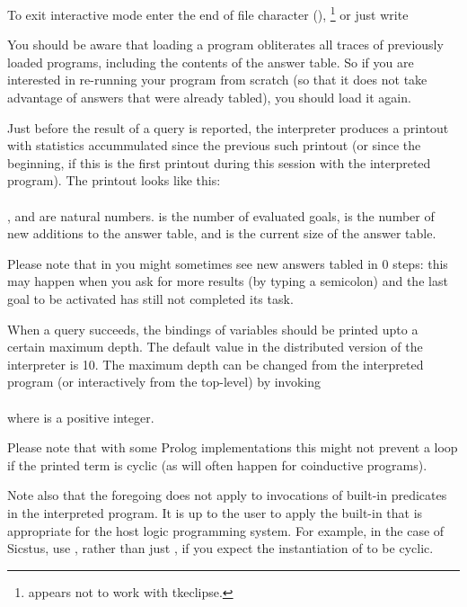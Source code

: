 To exit interactive mode enter the end of file character
(),%
\footnote{
   appears not to work with tkeclipse.}
or just write\\
\ind{}

You should be aware that loading a program obliterates all traces of
previously loaded programs, including the contents of the answer table.  So
if you are interested in re-running your program from scratch (so that it
does not take advantage of answers that were already tabled), you should load
it again.

Just before the result of a query is reported, the interpreter produces a
printout with statistics accummulated since the previous such printout (or
since the beginning, if this is the first printout during this session with
the interpreted program). The printout looks like
this:\\ \ind{}\\ ,
 and  are natural numbers.  is the number of
evaluated goals,  is the number of new additions to the answer table,
and  is the current size of the answer table.


Please note that in you might sometimes see new answers tabled in 0 steps:
this may happen when you ask for more results (by typing a semicolon) and the
last goal to be activated has still not completed its task.

When a query succeeds, the bindings of variables should be printed upto a
certain maximum depth.  The default value in the distributed version of the
interpreter is 10.  The maximum depth can be changed from the interpreted
program (or interactively from the top-level) by invoking\\
\ind{}\\
where  is a positive integer.

Please note that with some Prolog implementations this might not prevent a
loop if the printed term is cyclic (as will often happen for coinductive
programs).

Note also that the foregoing does not apply to invocations of built-in
predicates in the interpreted program.  It is up to the user to apply the
built-in that is appropriate for the host logic programming system.  For
example, in the case of Sicstus, use
, rather than just , if you expect the instantiation of  to be cyclic.



